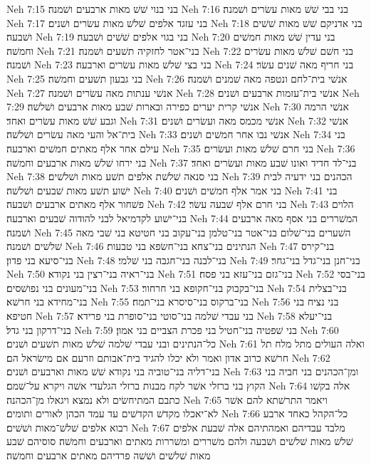 Neh 7:15  בני בנוי שׁשׁ מאות ארבעים ושׁמנה׃
Neh 7:16  בני בבי שׁשׁ מאות עשׂרים ושׁמנה׃
Neh 7:17  בני עזגד אלפים שׁלשׁ מאות עשׂרים ושׁנים׃
Neh 7:18  בני אדניקם שׁשׁ מאות שׁשׁים ושׁבעה׃
Neh 7:19  בני בגוי אלפים שׁשׁים ושׁבעה׃
Neh 7:20  בני עדין שׁשׁ מאות חמשׁים וחמשׁה׃
Neh 7:21  בני־אטר לחזקיה תשׁעים ושׁמנה׃
Neh 7:22  בני חשׁם שׁלשׁ מאות עשׂרים ושׁמנה׃
Neh 7:23  בני בצי שׁלשׁ מאות עשׂרים וארבעה׃
Neh 7:24  בני חריף מאה שׁנים עשׂר׃
Neh 7:25  בני גבעון תשׁעים וחמשׁה׃
Neh 7:26  אנשׁי בית־לחם ונטפה מאה שׁמנים ושׁמנה׃
Neh 7:27  אנשׁי ענתות מאה עשׂרים ושׁמנה׃
Neh 7:28  אנשׁי בית־עזמות ארבעים ושׁנים׃
Neh 7:29  אנשׁי קרית יערים כפירה ובארות שׁבע מאות ארבעים ושׁלשׁה׃
Neh 7:30  אנשׁי הרמה וגבע שׁשׁ מאות עשׂרים ואחד׃
Neh 7:31  אנשׁי מכמס מאה ועשׂרים ושׁנים׃
Neh 7:32  אנשׁי בית־אל והעי מאה עשׂרים ושׁלשׁה׃
Neh 7:33  אנשׁי נבו אחר חמשׁים ושׁנים׃
Neh 7:34  בני עילם אחר אלף מאתים חמשׁים וארבעה׃
Neh 7:35  בני חרם שׁלשׁ מאות ועשׂרים׃
Neh 7:36  בני ירחו שׁלשׁ מאות ארבעים וחמשׁה׃
Neh 7:37  בני־לד חדיד ואונו שׁבע מאות ועשׂרים ואחד׃
Neh 7:38  בני סנאה שׁלשׁת אלפים תשׁע מאות ושׁלשׁים׃
Neh 7:39  הכהנים בני ידעיה לבית ישׁוע תשׁע מאות שׁבעים ושׁלשׁה׃
Neh 7:40  בני אמר אלף חמשׁים ושׁנים׃
Neh 7:41  בני פשׁחור אלף מאתים ארבעים ושׁבעה׃
Neh 7:42  בני חרם אלף שׁבעה עשׂר׃
Neh 7:43  הלוים בני־ישׁוע לקדמיאל לבני להודוה שׁבעים וארבעה׃
Neh 7:44  המשׁררים בני אסף מאה ארבעים ושׁמנה׃
Neh 7:45  השׁערים בני־שׁלום בני־אטר בני־טלמן בני־עקוב בני חטיטא בני שׁבי מאה שׁלשׁים ושׁמנה׃
Neh 7:46  הנתינים בני־צחא בני־חשׂפא בני טבעות׃
Neh 7:47  בני־קירס בני־סיעא בני פדון׃
Neh 7:48  בני־לבנה בני־חגבה בני שׁלמי׃
Neh 7:49  בני־חנן בני־גדל בני־גחר׃
Neh 7:50  בני־ראיה בני־רצין בני נקודא׃
Neh 7:51  בני־גזם בני־עזא בני פסח׃
Neh 7:52  בני־בסי בני־מעונים בני נפושׁסים׃
Neh 7:53  בני־בקבוק בני־חקופא בני חרחור׃
Neh 7:54  בני־בצלית בני־מחידא בני חרשׁא׃
Neh 7:55  בני־ברקוס בני־סיסרא בני־תמח׃
Neh 7:56  בני נציח בני חטיפא׃
Neh 7:57  בני עבדי שׁלמה בני־סוטי בני־סופרת בני פרידא׃
Neh 7:58  בני־יעלא בני־דרקון בני גדל׃
Neh 7:59  בני שׁפטיה בני־חטיל בני פכרת הצביים בני אמון׃
Neh 7:60  כל־הנתינים ובני עבדי שׁלמה שׁלשׁ מאות תשׁעים ושׁנים׃
Neh 7:61  ואלה העולים מתל מלח תל חרשׁא כרוב אדון ואמר ולא יכלו להגיד בית־אבותם וזרעם אם מישׂראל הם׃
Neh 7:62  בני־דליה בני־טוביה בני נקודא שׁשׁ מאות וארבעים ושׁנים׃
Neh 7:63  ומן־הכהנים בני חביה בני הקוץ בני ברזלי אשׁר לקח מבנות ברזלי הגלעדי אשׁה ויקרא על־שׁמם׃
Neh 7:64  אלה בקשׁו כתבם המתיחשׂים ולא נמצא ויגאלו מן־הכהנה׃
Neh 7:65  ויאמר התרשׁתא להם אשׁר לא־יאכלו מקדשׁ הקדשׁים עד עמד הכהן לאורים ותומים׃
Neh 7:66  כל־הקהל כאחד ארבע רבוא אלפים שׁלשׁ־מאות ושׁשׁים׃
Neh 7:67  מלבד עבדיהם ואמהתיהם אלה שׁבעת אלפים שׁלשׁ מאות שׁלשׁים ושׁבעה ולהם משׁררים ומשׁררות מאתים וארבעים וחמשׁה׃ סוסיהם שׁבע מאות שׁלשׁים ושׁשׁה פרדיהם מאתים ארבעים וחמשׁה׃
